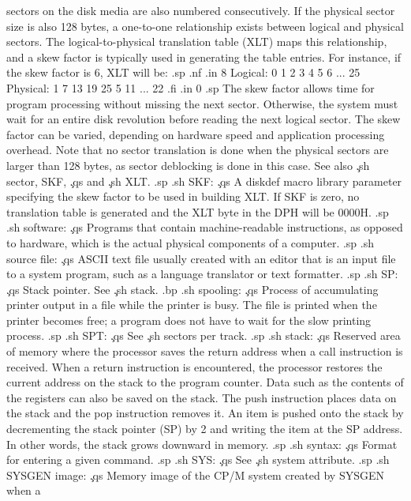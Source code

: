 sectors on the disk media are also numbered consecutively.  If 
the physical sector size is also 128 bytes, a one-to-one 
relationship exists between logical and physical sectors.  The 
logical-to-physical translation table (XLT) maps this 
relationship, and a skew factor is typically used in generating 
the table entries.  For instance, if the skew factor is 6, XLT 
will be:
.sp
.nf
.in 8
Logical:    0    1    2    3    4    5    6   ...   25
Physical:   1    7   13   19   25    5   11   ...   22
.fi
.in 0
.sp
The skew factor allows time for program processing without 
missing the next sector.  Otherwise, the system must wait for an 
entire disk revolution before reading the next logical sector.  
The skew factor can be varied, depending on hardware speed and 
application processing overhead.  Note that no sector translation 
is done when the physical sectors are larger than 128 bytes, as 
sector deblocking is done in this case.  See also \c
.sh
sector, SKF, \c
.qs
and \c
.sh
XLT.
.sp
.sh
SKF:  \c
.qs
A diskdef macro library parameter specifying the skew factor to 
be used in building XLT.  If SKF is zero, no translation table is 
generated and the XLT byte in the DPH will be 0000H.
.sp
.sh
software:  \c
.qs
Programs that contain machine-readable instructions, as opposed 
to hardware, which is the actual physical components of a 
computer.
.sp
.sh
source file:  \c
.qs
ASCII text file usually created with an editor that is an input 
file to a system program, such as a language translator or text 
formatter.
.sp
.sh
SP:  \c
.qs
Stack pointer.  See \c
.sh
stack.
.bp
.sh
spooling:  \c
.qs
Process of accumulating printer output in a file while the 
printer is busy.  The file is printed when the printer becomes 
free; a program does not have to wait for the slow printing 
process.
.sp
.sh
SPT:  \c
.qs
See \c
.sh
sectors per track.
.sp
.sh
stack:  \c
.qs
Reserved area of memory where the processor saves the return 
address when a call instruction is received.  When a return 
instruction is encountered, the processor restores the current 
address on the stack to the program counter.  Data such as the 
contents of the registers can also be saved on the stack.  The 
push instruction places data on the stack and the pop instruction 
removes it.  An item is pushed onto the stack by decrementing the 
stack pointer (SP) by 2 and writing the item at the SP address.  
In other words, the stack grows downward in memory.
.sp
.sh
syntax:  \c
.qs
Format for entering a given command.
.sp
.sh
SYS:  \c
.qs
See \c
.sh
system attribute.
.sp
.sh
SYSGEN image:  \c
.qs
Memory image of the CP/M system created by SYSGEN when a 
